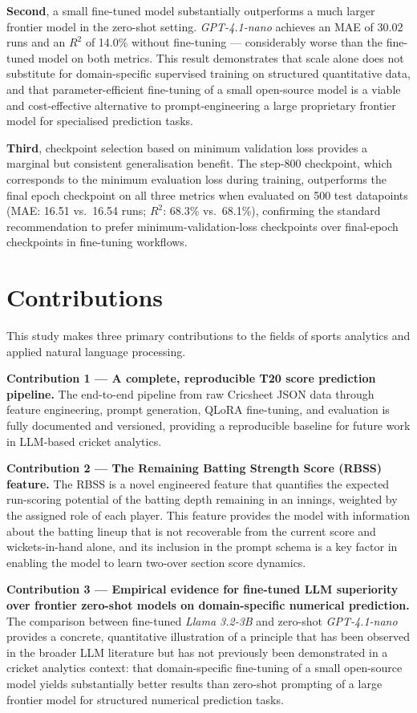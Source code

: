 \textbf{Second}, a small fine-tuned model substantially outperforms a much larger frontier model in the zero-shot setting. \textit{GPT-4.1-nano} achieves an MAE of 30.02 runs and an $R^2$ of 14.0\% without fine-tuning --- considerably worse than the fine-tuned model on both metrics. This result demonstrates that scale alone does not substitute for domain-specific supervised training on structured quantitative data, and that parameter-efficient fine-tuning of a small open-source model is a viable and cost-effective alternative to prompt-engineering a large proprietary frontier model for specialised prediction tasks.

\textbf{Third}, checkpoint selection based on minimum validation loss provides a marginal but consistent generalisation benefit. The step-800 checkpoint, which corresponds to the minimum evaluation loss during training, outperforms the final epoch checkpoint on all three metrics when evaluated on 500 test datapoints (MAE: 16.51 vs.\ 16.54 runs; $R^2$: 68.3\% vs.\ 68.1\%), confirming the standard recommendation to prefer minimum-validation-loss checkpoints over final-epoch checkpoints in fine-tuning workflows.

\section{Contributions}

This study makes three primary contributions to the fields of sports analytics and applied natural language processing.

\textbf{Contribution 1 --- A complete, reproducible T20 score prediction pipeline.} The end-to-end pipeline from raw Cricsheet JSON data through feature engineering, prompt generation, QLoRA fine-tuning, and evaluation is fully documented and versioned, providing a reproducible baseline for future work in LLM-based cricket analytics.

\textbf{Contribution 2 --- The Remaining Batting Strength Score (RBSS) feature.} The RBSS is a novel engineered feature that quantifies the expected run-scoring potential of the batting depth remaining in an innings, weighted by the assigned role of each player. This feature provides the model with information about the batting lineup that is not recoverable from the current score and wickets-in-hand alone, and its inclusion in the prompt schema is a key factor in enabling the model to learn two-over section score dynamics.

\textbf{Contribution 3 --- Empirical evidence for fine-tuned LLM superiority over frontier zero-shot models on domain-specific numerical prediction.} The comparison between fine-tuned \textit{Llama 3.2-3B} and zero-shot \textit{GPT-4.1-nano} provides a concrete, quantitative illustration of a principle that has been observed in the broader LLM literature but has not previously been demonstrated in a cricket analytics context: that domain-specific fine-tuning of a small open-source model yields substantially better results than zero-shot prompting of a large frontier model for structured numerical prediction tasks.

